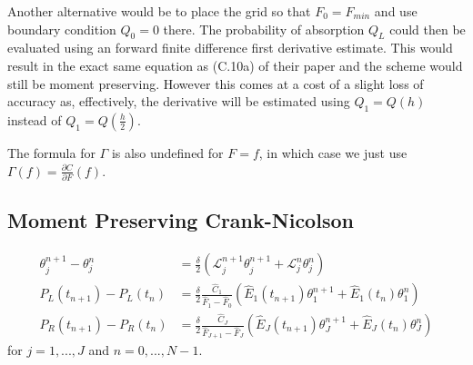 \documentclass[]{rAMF2e}
\begin{document}
Another alternative would be to place the grid so that $F_0 = F_{min}$ and use boundary condition $Q_0 = 0$ there. The probability of absorption $Q_L$ could then be evaluated using an forward finite difference first derivative estimate. This would result in the exact same equation as (C.10a) of their paper and the scheme would still be moment preserving. However this comes at a cost of a slight loss of accuracy as, effectively, the derivative will be estimated using $Q_1 = Q(h)$ instead of $Q_1 = Q(\frac{h}{2})$.

The formula for $\Gamma$ is also undefined for $F=f$, in which case we just use $\Gamma(f) = \frac{\partial C}{\partial F}(f)$.


\subsection{Moment Preserving Crank-Nicolson}
\begin{subequations}
\begin{align}\label{eqn_cn_1}
\theta_j^{n+1}-\theta_j^n &= \frac{\delta}{2} \left( \mathcal{L}_{j}^{n+1}\theta_j^{n+1} + \mathcal{L}_{j}^{n}\theta_j^{n} \right) \\
P_L (t_{n+1})- P_L (t_{n}) &= \frac{\delta}{2} \frac{\hat{C}_1}{\hat{F}_1-\hat{F}_0}\left(\hat{E}_1(t_{n+1})\theta_1^{n+1}+\hat{E}_1(t_{n})\theta_1^{n} \right)\\
P_R (t_{n+1})-P_R (t_{n}) &=  \frac{\delta}{2} \frac{\hat{C}_J}{\hat{F}_{J+1}-\hat{F}_J}\left(\hat{E}_J(t_{n+1})\theta_J^{n+1}+\hat{E}_J(t_{n})\theta_J^{n} \right)
\end{align}
\end{subequations}
for $j=1,...,J$ and $n=0,...,N-1$.
\end{document}
